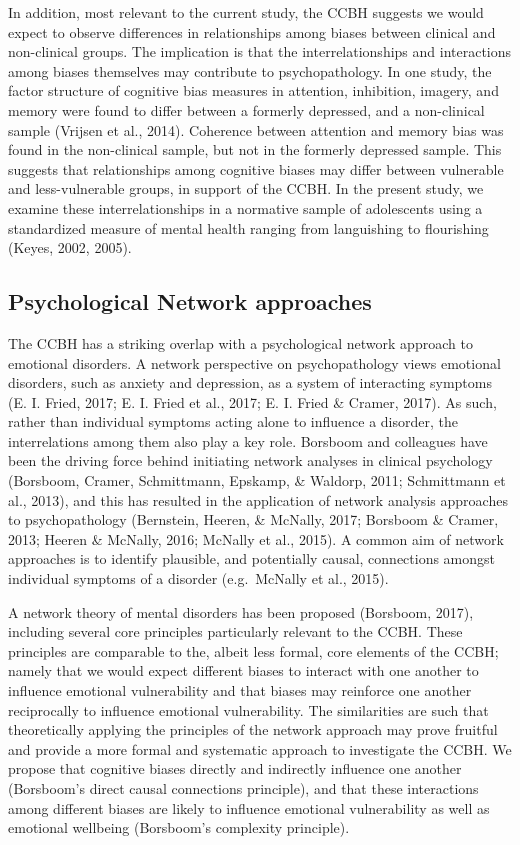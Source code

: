 \documentclass[man,floatsintext]{apa6}
\begin{document}
In addition, most relevant to the current study, the CCBH suggests we would expect to observe differences in relationships among biases between clinical and non-clinical groups. The implication is that the interrelationships and interactions among biases themselves may contribute to psychopathology. In one study, the factor structure of cognitive bias measures in attention, inhibition, imagery, and memory were found to differ between a formerly depressed, and a non-clinical sample (Vrijsen et al., 2014). Coherence between attention and memory bias was found in the non-clinical sample, but not in the formerly depressed sample. This suggests that relationships among cognitive biases may differ between vulnerable and less-vulnerable groups, in support of the CCBH. In the present study, we examine these interrelationships in a normative sample of adolescents using a standardized measure of mental health ranging from languishing to flourishing (Keyes, 2002, 2005).

\hypertarget{psychological-network-approaches}{%
\subsection{Psychological Network approaches}\label{psychological-network-approaches}}

The CCBH has a striking overlap with a psychological network approach to emotional disorders. A network perspective on psychopathology views emotional disorders, such as anxiety and depression, as a system of interacting symptoms (E. I. Fried, 2017; E. I. Fried et al., 2017; E. I. Fried \& Cramer, 2017). As such, rather than individual symptoms acting alone to influence a disorder, the interrelations among them also play a key role. Borsboom and colleagues have been the driving force behind initiating network analyses in clinical psychology (Borsboom, Cramer, Schmittmann, Epskamp, \& Waldorp, 2011; Schmittmann et al., 2013), and this has resulted in the application of network analysis approaches to psychopathology (Bernstein, Heeren, \& McNally, 2017; Borsboom \& Cramer, 2013; Heeren \& McNally, 2016; McNally et al., 2015). A common aim of network approaches is to identify plausible, and potentially causal, connections amongst individual symptoms of a disorder (e.g.~McNally et al., 2015).

A network theory of mental disorders has been proposed (Borsboom, 2017), including several core principles particularly relevant to the CCBH. These principles are comparable to the, albeit less formal, core elements of the CCBH; namely that we would expect different biases to interact with one another to influence emotional vulnerability and that biases may reinforce one another reciprocally to influence emotional vulnerability. The similarities are such that theoretically applying the principles of the network approach may prove fruitful and provide a more formal and systematic approach to investigate the CCBH. We propose that cognitive biases directly and indirectly influence one another (Borsboom's direct causal connections principle), and that these interactions among different biases are likely to influence emotional vulnerability as well as emotional wellbeing (Borsboom's complexity principle).
\end{document}
